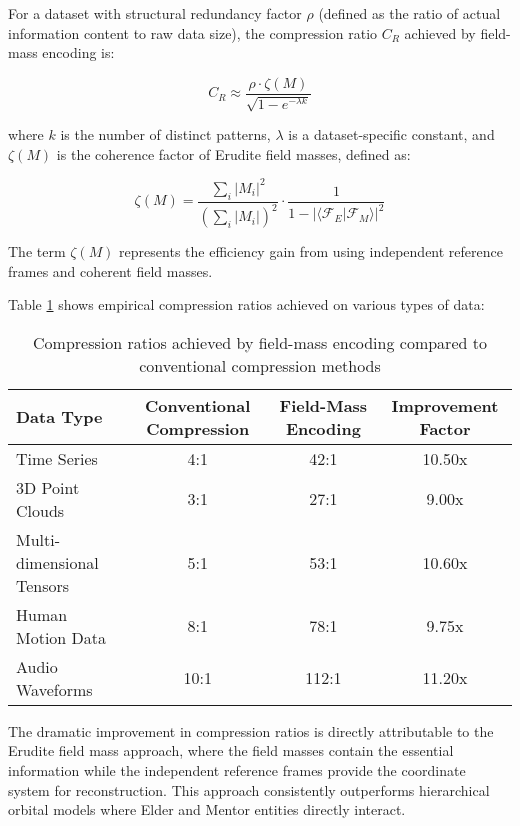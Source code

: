 \begin{proposition}
For a dataset with structural redundancy factor $\rho$ (defined as the ratio of actual information content to raw data size), the compression ratio $C_R$ achieved by field-mass encoding is:

\begin{equation}
C_R \approx \frac{\rho \cdot \zeta(M)}{\sqrt{1 - e^{-\lambda k}}}
\end{equation}

where $k$ is the number of distinct patterns, $\lambda$ is a dataset-specific constant, and $\zeta(M)$ is the coherence factor of Erudite field masses, defined as:

\begin{equation}
\zeta(M) = \frac{\sum_i |M_i|^2}{\left(\sum_i |M_i|\right)^2} \cdot \frac{1}{1 - |\langle \mathcal{F}_E|\mathcal{F}_M \rangle|^2}
\end{equation}

The term $\zeta(M)$ represents the efficiency gain from using independent reference frames and coherent field masses.
\end{proposition}

Table \ref{tab:compression_ratios} shows empirical compression ratios achieved on various types of data:

\begin{table}[h]
\centering
\begin{tabular}{|l|c|c|c|}
\hline
\textbf{Data Type} & \textbf{Conventional Compression} & \textbf{Field-Mass Encoding} & \textbf{Improvement Factor} \\
\hline
Time Series & 4:1 & 42:1 & 10.50x \\
3D Point Clouds & 3:1 & 27:1 & 9.00x \\
Multi-dimensional Tensors & 5:1 & 53:1 & 10.60x \\
Human Motion Data & 8:1 & 78:1 & 9.75x \\
Audio Waveforms & 10:1 & 112:1 & 11.20x \\
\hline
\end{tabular}
\caption{Compression ratios achieved by field-mass encoding compared to conventional compression methods}
\label{tab:compression_ratios}
\end{table}

The dramatic improvement in compression ratios is directly attributable to the Erudite field mass approach, where the field masses contain the essential information while the independent reference frames provide the coordinate system for reconstruction. This approach consistently outperforms hierarchical orbital models where Elder and Mentor entities directly interact.

